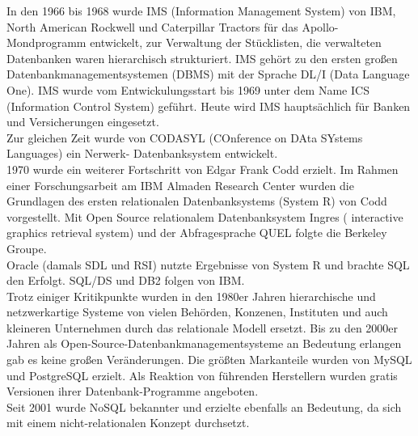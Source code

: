 \documentclass[12pt,a4paper]{report}
\begin{document}
\begin{onehalfspace}
In den 1966 bis 1968 wurde IMS (Information Management System) von IBM, North American Rockwell und Caterpillar Tractors für das Apollo-Mondprogramm entwickelt, zur Verwaltung der Stücklisten, die verwalteten Datenbanken waren hierarchisch strukturiert. IMS gehört zu den ersten großen Datenbankmanagementsystemen (DBMS) mit der Sprache DL/I (Data Language One). IMS wurde vom Entwickulungsstart bis 1969 unter dem Name  ICS (Information Control System) geführt. Heute wird IMS hauptsächlich für Banken und Versicherungen eingesetzt.\\

Zur gleichen Zeit wurde von CODASYL (COnference on DAta SYstems Languages) ein Nerwerk- Datenbanksystem entwickelt.\\

1970 wurde ein weiterer Fortschritt von Edgar Frank Codd erzielt. Im Rahmen einer Forschungsarbeit am IBM Almaden Research Center wurden die Grundlagen des ersten relationalen Datenbanksystems (System R) von Codd vorgestellt. Mit Open Source relationalem Datenbanksystem Ingres ( interactive graphics retrieval system) und der Abfragesprache QUEL folgte die Berkeley Groupe.\\

Oracle (damals SDL und RSI) nutzte Ergebnisse von System R und brachte SQL den Erfolgt. SQL/DS und DB2 folgen von IBM.\\

Trotz einiger Kritikpunkte wurden in den 1980er Jahren hierarchische und netzwerkartige Systeme von vielen Behörden, Konzenen, Instituten und auch kleineren Unternehmen durch das relationale Modell ersetzt. Bis zu den 2000er Jahren als Open-Source-Datenbankmanagementsysteme an Bedeutung erlangen gab es keine großen Veränderungen. Die größten Markanteile wurden von MySQL und PostgreSQL erzielt.
Als Reaktion von führenden Herstellern wurden gratis Versionen ihrer Datenbank-Programme angeboten.\\

Seit 2001 wurde  NoSQL bekannter und erzielte ebenfalls an Bedeutung, da sich mit einem nicht-relationalen Konzept durchsetzt.

\end{onehalfspace}
\end{document}
